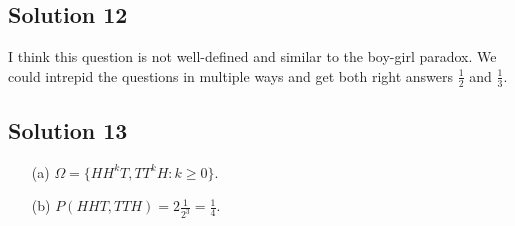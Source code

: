 \subsection*{Solution 12}

I think this question is not well-defined and similar to the boy-girl paradox.
We could intrepid the questions in multiple ways and get both right answers $\frac{1}{2}$ and $\frac{1}{3}$.


\subsection*{Solution 13}

\begin{itemize}
    \item[(a)] $\Omega = \{ HH^kT, TT^kH: k \geq 0 \}$.
    \item[(b)] $P(HHT, TTH) = 2 \frac{1}{2^3} = \frac{1}{4}$.
\end{itemize}
